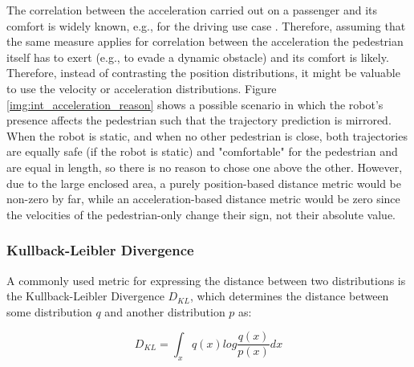 The correlation between the acceleration carried out on a passenger and its comfort is widely known, e.g., for the driving use case \cite{Hoberock1976}. Therefore, assuming that the same measure applies for correlation between the acceleration the pedestrian itself has to exert (e.g., to evade a dynamic obstacle) and its comfort is likely. Therefore, instead of contrasting the position distributions, it might be valuable to use the velocity or acceleration distributions. Figure \ref{img:int_acceleration_reason} shows a possible scenario in which the robot's presence affects the pedestrian such that the trajectory prediction is mirrored. When the robot is static, and when no other pedestrian is close, both trajectories are equally safe (if the robot is static)  and "comfortable" for the pedestrian and are equal in length, so there is no reason to chose one above the other. However, due to the large enclosed area, a purely position-based distance metric would be non-zero by far, while an acceleration-based distance metric would be zero since the velocities of the pedestrian-only change their sign, not their absolute value.

\subsubsection{Kullback-Leibler Divergence}
A commonly used metric for expressing the distance between two distributions is the Kullback-Leibler Divergence $D_{KL}$, which determines the distance between  some distribution $q$ and another distribution $p$ as:

\begin{equation}
D_{KL} = \int_x q(x) log \frac{q(x)}{p(x)} dx    
\end{equation}

